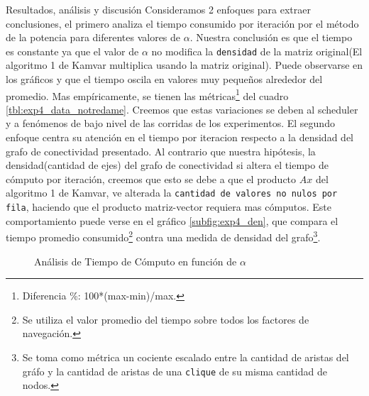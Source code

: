 \begin{LaTeXdescription}
    \item[Resultados, an\'alisis y discusi\'on]
    Consideramos 2 enfoques para extraer conclusiones, el primero analiza el tiempo consumido por iteración por el método de la potencia para diferentes valores de $\alpha$. Nuestra conclusión es que el tiempo es constante ya que el valor de $\alpha$ no modifica la \texttt{densidad} de la matriz original(El algoritmo 1 de Kamvar multiplica usando la matriz original). Puede observarse en los gráficos \label{subfig:exp4_tiempo_iteracion} y \label{subfig:exp4_tiempo_iteracion_log} que el tiempo oscila en valores muy pequeños alrededor del promedio. Mas empíricamente, se tienen las métricas\footnote{Diferencia \%: 100*(max-min)/max.} del cuadro \ref{tbl:exp4_data_notredame}. Creemos que estas variaciones se deben al scheduler y a fenómenos de bajo nivel de las corridas de los experimentos. El segundo enfoque centra su atención en el tiempo por iteracion respecto a la densidad del grafo de conectividad presentado. Al contrario que nuestra hipótesis, la densidad(cantidad de ejes) del grafo de conectividad si altera el tiempo de cómputo por iteración, creemos que esto se debe a que el producto $Ax$ del algoritmo 1 de Kamvar, ve alterada la \texttt{cantidad de valores no nulos por fila}, haciendo que el producto matriz-vector requiera mas cómputos. Este comportamiento puede verse en el gráfico \ref{subfig:exp4_den}, que compara el tiempo promedio consumido\footnote{Se utiliza el valor promedio del tiempo sobre todos los factores de navegación.} contra una medida de densidad del grafo\footnote{Se toma como métrica un cociente escalado entre la cantidad de aristas del gráfo y la cantidad de aristas de una \texttt{clique} de su misma cantidad de nodos.}.

    
\end{LaTeXdescription}


\begin{figure}[!h]
    \centering
    \caption{An\'alisis de Tiempo de C\'omputo en funci\'on de $\alpha$}
\end{figure}

